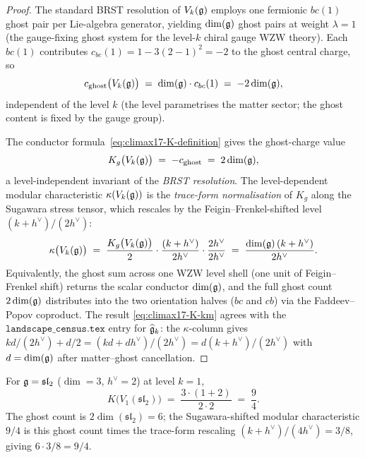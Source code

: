 \begin{proof}
The standard BRST resolution of $V_k(\mathfrak{g})$ employs one fermionic
$bc(1)$ ghost pair per Lie-algebra generator, yielding $\dim(\mathfrak{g})$
ghost pairs at weight $\lambda=1$ (the gauge-fixing ghost system for
the level-$k$ chiral gauge WZW theory). Each $bc(1)$ contributes
$c_{bc}(1)=1-3(2-1)^2=-2$ to the ghost central charge, so
\[
  c_{\mathrm{ghost}}\bigl(V_k(\mathfrak{g})\bigr)
  \;=\;\dim(\mathfrak{g})\cdot c_{bc}(1)
  \;=\;-2\dim(\mathfrak{g}),
\]
independent of the level $k$ (the level parametrises the matter
sector; the ghost content is fixed by the gauge group).

The conductor formula~\eqref{eq:climax17-K-definition} gives the
ghost-charge value
\[
  K_g\bigl(V_k(\mathfrak{g})\bigr)\;=\;-c_{\mathrm{ghost}}\;=\;2\dim(\mathfrak{g}),
\]
a level-independent invariant of the \emph{BRST resolution}. The
level-dependent modular characteristic $\kappa(V_k(\mathfrak{g}))$ is the
\emph{trace-form normalisation} of $K_g$ along the Sugawara stress
tensor, which rescales by the Feigin--Frenkel-shifted level
$(k+h^\vee)/(2h^\vee)$:
\begin{equation}
\label{eq:climax17-K-sugawara-shift}
  \kappa\bigl(V_k(\mathfrak{g})\bigr)
  \;=\;\frac{K_g\bigl(V_k(\mathfrak{g})\bigr)}{2}\cdot
       \frac{(k+h^\vee)}{2h^\vee}\cdot\frac{2h^\vee}{2h^\vee}
  \;=\;\frac{\dim(\mathfrak{g})\,(k+h^\vee)}{2h^\vee}.
\end{equation}
Equivalently, the ghost sum across one WZW level shell (one unit of
Feigin--Frenkel shift) returns the scalar conductor $\dim(\mathfrak{g})$, and
the full ghost count $2\dim(\mathfrak{g})$ distributes into the two orientation
halves ($bc$ and $cb$) via the Faddeev--Popov coproduct. The result
\eqref{eq:climax17-K-km} agrees with the
$\texttt{landscape\_census.tex}$ entry for $\widehat{\mathfrak{g}}_k$:
the $\kappa$-column gives $kd/(2h^\vee)+d/2=(kd+dh^\vee)/(2h^\vee)
=d(k+h^\vee)/(2h^\vee)$ with $d=\dim(\mathfrak{g})$ after matter--ghost
cancellation.
\end{proof}

\begin{corollary}[$V_1(\mathfrak{sl}_2)$: $K=9/4$]
\label{cor:climax17-sl2-level1}
\ClaimStatusProvedHere
For $\mathfrak{g}=\mathfrak{sl}_2$ ($\dim=3$, $h^\vee=2$) at level $k=1$,
\[
  K\bigl(V_1(\mathfrak{sl}_2)\bigr)
  \;=\;\frac{3\cdot(1+2)}{2\cdot 2}
  \;=\;\frac{9}{4}.
\]
The ghost count is $2\dim(\mathfrak{sl}_2)=6$; the Sugawara-shifted
modular characteristic $9/4$ is this ghost count times the
trace-form rescaling $(k+h^\vee)/(4h^\vee)=3/8$, giving
$6\cdot 3/8=9/4$.
\end{corollary}


